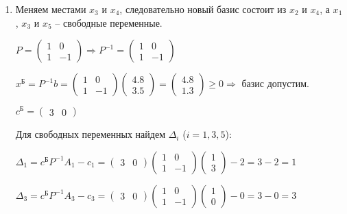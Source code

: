 \begin{enumerate}[leftmargin=*]
Выводим из базиса переменную $x_r$, т.ч. 
$r = \argmin\limits_j\left( \left. \dfrac{x_j^\text{Б}}{z_j}\right|_{z_j>0} \right) = 3 \Rightarrow x_3$.

\item 
Меняем местами $x_3$ и $x_4$, следовательно новый базис состоит из $x_2$ и $x_4$, а $x_1$, $x_3$ и $x_5$ -- свободные переменные.

$P = 
\begin{pmatrix}
	1 & 0 \\
	1 & -1
\end{pmatrix} \Rightarrow
P^{-1} = 
\begin{pmatrix}
	1 & 0 \\
	1 & -1
\end{pmatrix}$

$x^\text{Б} = P^{-1}b =
\begin{pmatrix}
	1 & 0 \\
	1 & -1
\end{pmatrix}
\begin{pmatrix}
	4.8 \\
	3.5
\end{pmatrix} =
\begin{pmatrix}
	4.8 \\
	1.3
\end{pmatrix} \geq 0
\Rightarrow$ базис допустим.

$c^\text{Б} = 
\begin{pmatrix}
	3 & 0
\end{pmatrix}$

Для свободных переменных найдем $\Delta_i$ ($i = 1, 3, 5$):

$\Delta_1 = c^\text{Б} P^{-1} A_1 - c_1 =
\begin{pmatrix}
	3 & 0
\end{pmatrix}
\begin{pmatrix}
	1 & 0 \\
	1 & -1
\end{pmatrix}
\begin{pmatrix}
	1 \\
	3
\end{pmatrix} - 2 = 3 - 2 = 1$

$\Delta_3 = c^\text{Б} P^{-1} A_3 - c_3 =
\begin{pmatrix}
	3 & 0
\end{pmatrix}
\begin{pmatrix}
	1 & 0 \\
	1 & -1
\end{pmatrix}
\begin{pmatrix}
	1 \\
	0
\end{pmatrix} - 0 = 3 - 0 = 3$


\end{enumerate}
